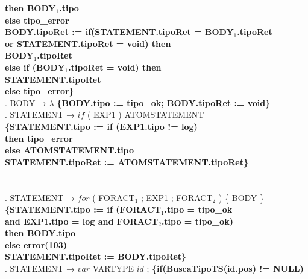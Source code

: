 \begin{tabbing}
    \>                    \>           \>          \>\textbf{then BODY$_1$.tipo}\\
    \>                    \>           \>\textbf{else tipo\_error}\\
    \>                    \>\textbf{BODY.tipoRet := if(STATEMENT.tipoRet = BODY$_1$.tipoRet}\\
    \>                    \>           \>\textbf{or STATEMENT.tipoRet = void) then}\\
    \>                    \>           \>          \>\textbf{BODY$_1$.tipoRet}\\
    \>                    \>           \>\textbf{else if (BODY$_1$.tipoRet = void) then}\\
    \>                    \>           \>          \>\textbf{STATEMENT.tipoRet}\\
    \>                    \>           \>\textbf{else tipo\_error\}}\\
    . BODY → $\lambda$ \textbf{\{BODY.tipo := tipo\_ok; BODY.tipoRet := void\}}\\
    . STATEMENT → $if$ ( EXP1 ) ATOMSTATEMENT\\
    \>                    \> \textbf{\{STATEMENT.tipo := if (EXP1.tipo != log)}\\
    \>                    \> \> \>\textbf{then tipo\_error}\\
    \>                    \> \> \textbf{else ATOMSTATEMENT.tipo}\\
    \>                    \> \textbf{STATEMENT.tipoRet := ATOMSTATEMENT.tipoRet\}}\\
    \\
    \\
    . STATEMENT → $for$ ( FORACT$_1$ ; EXP1 ; FORACT$_2$ ) \{ BODY \}\\
    \>                    \> \textbf{\{STATEMENT.tipo := if (FORACT$_1$.tipo = tipo\_ok}\\
    \>                    \> \>\textbf{and EXP1.tipo = log and FORACT$_2$.tipo = tipo\_ok)}\\
    \>                    \> \> \>\textbf{then BODY.tipo}\\
    \>                    \> \>\textbf{else error(103)}\\
    \>                    \> \textbf{STATEMENT.tipoRet := BODY.tipoRet\}}\\
    . STATEMENT → $var$ VARTYPE $id$ ; \textbf{\{if(BuscaTipoTS(id.pos) != NULL)} \\
    \>              \>          \>

\end{tabbing}
